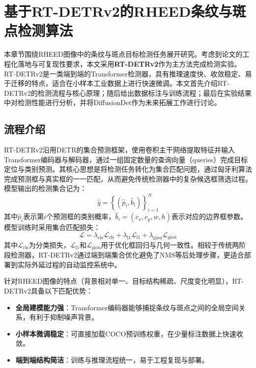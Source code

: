 \clearpage

\section{基于RT-DETRv2的RHEED条纹与斑点检测算法}

本章节围绕RHEED图像中的条纹与斑点目标检测任务展开研究。考虑到论文的工程化落地与可复现性要求，本文采用\textbf{RT-DETRv2}作为主方法完成检测实验。RT-DETRv2是一类端到端的Transformer检测器，具有推理速度快、收敛稳定、易于迁移的特点，适合在小样本工业数据上进行快速微调。本文首先介绍RT-DETRv2的检测流程与核心原理；随后给出数据标注与训练流程；最后在实验结果中对检测性能进行分析，并将DiffusionDet作为未来拓展工作进行讨论。

\subsection{流程介绍}

RT-DETRv2沿用DETR的集合预测框架，使用卷积主干网络提取特征并输入Transformer编码器与解码器，通过一组固定数量的查询向量（queries）完成目标定位与类别预测。其核心思想是将检测任务转化为集合匹配问题，通过匈牙利算法完成预测框与真实框的一一匹配，从而避免传统检测器中的复杂候选框筛选过程。模型输出的检测集合记为：
\begin{equation}
    \hat{y} = \left\{ (\hat{p}_i, \hat{b}_i) \right\}_{i=1}^{N}
\end{equation}
其中$\hat{p}_i$表示第$i$个预测框的类别概率，$\hat{b}_i=(c_x, c_y, w, h)$表示对应的边界框参数。模型训练时采用集合匹配损失：
\begin{equation}
    \mathcal{L} = \lambda_{\text{cls}} \mathcal{L}_{\text{cls}} + \lambda_{\text{l1}} \mathcal{L}_{\text{l1}} + \lambda_{\text{giou}} \mathcal{L}_{\text{giou}}
\end{equation}
其中$\mathcal{L}_{\text{cls}}$为分类损失，$\mathcal{L}_{\text{l1}}$和$\mathcal{L}_{\text{giou}}$用于优化框回归与几何一致性。相较于传统两阶段检测器，RT-DETRv2通过端到端集合优化避免了NMS等后处理步骤，更适合部署到实际外延过程的自动监控系统中。

针对RHEED图像的特点（背景相对单一、目标结构稀疏、尺度变化明显），RT-DETRv2具备以下匹配优势：
\begin{itemize}
    \item \textbf{全局建模能力强}：Transformer编码器能够捕捉条纹与斑点之间的全局空间关系，有利于抑制噪声背景。
    \item \textbf{小样本微调稳定}：可直接加载COCO预训练权重，在少量标注数据上快速收敛。
    \item \textbf{端到端结构简洁}：训练与推理流程统一，易于工程复现与部署。
\end{itemize}

